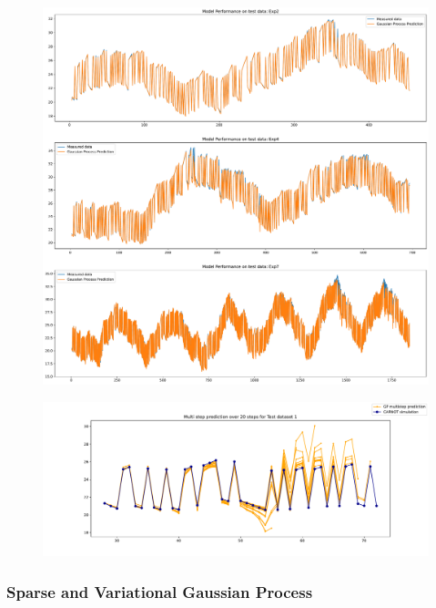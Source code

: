 \begin{figure}[ht]
    \centering
    \includegraphics[width = \textwidth]{Plots/GP_113_test_performance.pdf}
    \caption{}
    \label{fig:GP_test_validation}
\end{figure}


\begin{figure}[ht]
    \centering
    \includegraphics[width =
    \textwidth]{Plots/GP_113_-1pts_test_prediction_20_steps.pdf}
    \caption{}
    \label{fig:GP_multistep_validation}
\end{figure}

\clearpage

\subsubsection{Sparse and Variational Gaussian Process}


